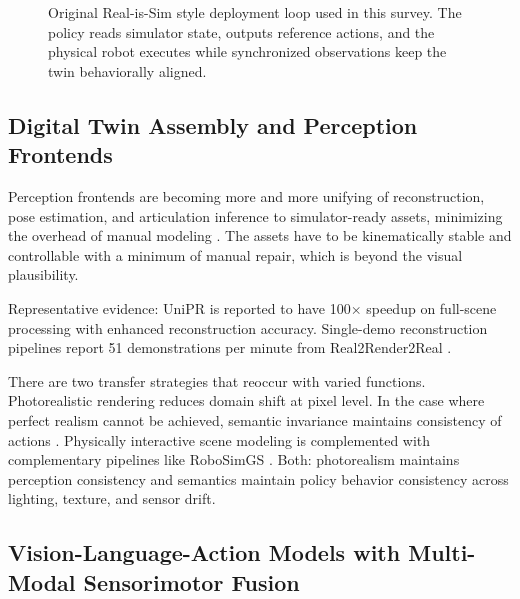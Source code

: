 \documentclass[11pt,a4paper]{article}
\begin{document}
\begin{figure}[t]
\caption{Original Real-is-Sim style deployment loop used in this survey. The policy reads simulator state, outputs reference actions, and the physical robot executes while synchronized observations keep the twin behaviorally aligned.}
\label{fig:realisim_digital_twin}
\end{figure}

\subsection{Digital Twin Assembly and Perception Frontends}

Perception frontends are becoming more and more unifying of reconstruction, pose estimation, and articulation inference to simulator-ready assets, minimizing the overhead of manual modeling \cite{zhang2025unipr,lim2025splat2real,wu2024aomgen,cai2025gausstwin,yu2025real2render2real,jiang2024digitaltwin}. The assets have to be kinematically stable and controllable with a minimum of manual repair, which is beyond the visual plausibility.

Representative evidence: UniPR is reported to have 100$\times$ speedup on full-scene processing with enhanced reconstruction accuracy. Single-demo reconstruction pipelines report 51 demonstrations per minute from Real2Render2Real \cite{zhang2025unipr,yu2025real2render2real}.

There are two transfer strategies that reoccur with varied functions. Photorealistic rendering reduces domain shift at pixel level. In the case where perfect realism cannot be achieved, semantic invariance maintains consistency of actions \cite{qureshi2025splatsim,tang2025semantic}. Physically interactive scene modeling is complemented with complementary pipelines like RoboSimGS \cite{zhao2026robosimgs}. Both: photorealism maintains perception consistency and semantics maintain policy behavior consistency across lighting, texture, and sensor drift.

\subsection{Vision-Language-Action Models with Multi-Modal Sensorimotor Fusion}
\end{document}
